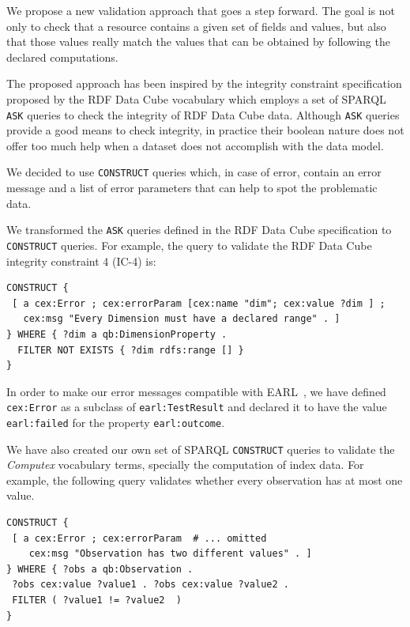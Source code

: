 \documentclass{llncs}
\begin{document}
We propose a new validation approach that goes a step forward. 
The goal is not only to check that a resource contains a given set of fields and values, but also that those values really match
the values that can be obtained by following the declared computations.
 
The proposed approach has been inspired by the integrity
constraint specification proposed by the RDF Data Cube vocabulary 
which employs a set of SPARQL
 \lstinline|ASK| queries to check the integrity of RDF Data Cube data. 
 Although \lstinline|ASK| queries provide a good means to check integrity, in
 practice their boolean nature does not offer too much help when a 
 dataset does not accomplish with the data model.

We decided to use \lstinline|CONSTRUCT| queries which, in case of error, 
  contain an error message and a list of error parameters that can help to spot
  the problematic data.

 We transformed the \lstinline|ASK| queries defined in the RDF Data Cube
 specification to \lstinline|CONSTRUCT| queries. For example, the
 query to validate the RDF Data Cube integrity constraint 4 (IC-4) is:
 
\begin{lstlisting}[style=SPARQL]
CONSTRUCT {
 [ a cex:Error ; cex:errorParam [cex:name "dim"; cex:value ?dim ] ;
   cex:msg "Every Dimension must have a declared range" . ]
} WHERE { ?dim a qb:DimensionProperty .
  FILTER NOT EXISTS { ?dim rdfs:range [] }
}
\end{lstlisting}
 
In order to make our error messages compatible with EARL~\cite{EARL}, we have
 defined \lstinline|cex:Error| as a subclass of \lstinline|earl:TestResult| and 
 declared it to have the value \lstinline|earl:failed| for the property
 \lstinline|earl:outcome|.
 
We have also created our own set of SPARQL \lstinline|CONSTRUCT| queries to
validate the \emph{Computex} vocabulary terms, specially the computation of index data.
For example, the following query validates whether every observation 
  has at most one value.
 
\begin{lstlisting}[style=SPARQL]
CONSTRUCT {
 [ a cex:Error ; cex:errorParam  # ... omitted 
    cex:msg "Observation has two different values" . ]
} WHERE { ?obs a qb:Observation . 
 ?obs cex:value ?value1 . ?obs cex:value ?value2 .
 FILTER ( ?value1 != ?value2  )
}
\end{lstlisting}
\end{document}
